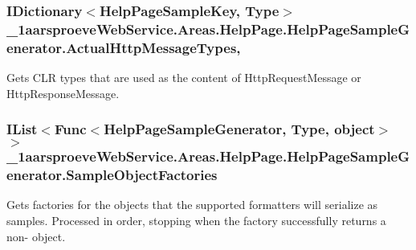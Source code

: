 \subsubsection[{Actual\+Http\+Message\+Types}]{\setlength{\rightskip}{0pt plus 5cm}I\+Dictionary$<${\bf Help\+Page\+Sample\+Key}, Type$>$ \+\_\+1aarsproeve\+Web\+Service.\+Areas.\+Help\+Page.\+Help\+Page\+Sample\+Generator.\+Actual\+Http\+Message\+Types\hspace{0.3cm}{\ttfamily [get]}, {\ttfamily [set]}}\label{class__1aarsproeve_web_service_1_1_areas_1_1_help_page_1_1_help_page_sample_generator_a9f1ac86d102c5386627d7098a52d836f}


Gets C\+L\+R types that are used as the content of Http\+Request\+Message or Http\+Response\+Message. 

\hypertarget{class__1aarsproeve_web_service_1_1_areas_1_1_help_page_1_1_help_page_sample_generator_a29295b515e45cebc44d8a111e9dd3d01}{}
\subsubsection[{Sample\+Object\+Factories}]{\setlength{\rightskip}{0pt plus 5cm}I\+List$<$Func$<${\bf Help\+Page\+Sample\+Generator}, Type, object$>$ $>$ \+\_\+1aarsproeve\+Web\+Service.\+Areas.\+Help\+Page.\+Help\+Page\+Sample\+Generator.\+Sample\+Object\+Factories\hspace{0.3cm}{\ttfamily [get]}}\label{class__1aarsproeve_web_service_1_1_areas_1_1_help_page_1_1_help_page_sample_generator_a29295b515e45cebc44d8a111e9dd3d01}


Gets factories for the objects that the supported formatters will serialize as samples. Processed in order, stopping when the factory successfully returns a non-\/ object. 

